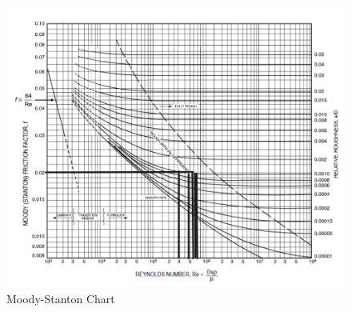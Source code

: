 \documentclass[12pt]{article}
\begin{document}
\begin{enumerate}[a)]
\begin{figure}[h!] %
\centering
   \includegraphics[width=5in]{MoodyChart.jpg}
   \caption{Moody-Stanton Chart}
   \label{fig:MoodyChart} 
\end{figure}


\end{enumerate}
\end{document}
